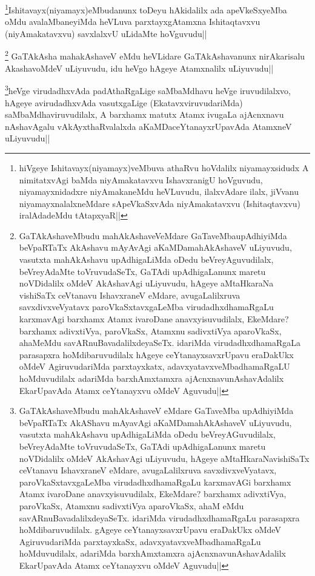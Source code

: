 \begin{artha}
\footnote{hiVgeye Ishitavayx(niyamayx)veMbuva athaRvu hoVdalilx niyamayxsidudx A nimitatxvAgi baMda niyAmakatavxvu IshavxranigU hoVguvudu, niyamayxnidadxre niyAmakaneMdu heVLuvudu, ilalxvAdare ilalx, jiVvanu niyamayxnalalxneMdare sApeVkaSxvAda niyAmakatavxvu (Ishitaqtavxvu) iralAdadeMdu tAtapxyaR||}Ishitavayx(niyamayx)eMbudanunx toDeyu hAkidalilx ada apeVkeSxyeMba oMdu avalaMbaneyiMda heVLuva parxtayxgAtamxna Ishitaqtavxvu (niyAmakatavxvu) savxlalxvU uLidaMte hoVguvudu||
\end{artha}

\begin{artha}
\footnote{GaTAkAshaveMbudu mahAkAshaveVeMdare GaTaveMbaupAdhiyiMda beVpaRTaTx AkAshavu mAyAvAgi aKaMDamahAkAshaveV uLiyuvudu, vasutxta mahAkAshavu upAdhigaLiMda oDedu beVreyAguvudilalx, beVreyAdaMte toVruvudaSeTx, GaTAdi upAdhigaLanunx maretu noVDidalilx oMdeV AkAshavAgi uLiyuvudu, hAgeye aMtaHkaraNa vishiSaTx ceVtanavu IshavxraneV eMdare, avugaLalilxruva savxdivxveVyatavx paroVkaSxtavxgaLeMba virudadhxdhamaRgaLu karxmavAgi barxhamx Atamx ivaroDane anavxyisuvudilalx, EkeMdare? barxhamx adivxtiVya, paroVkaSx, Atamxnu sadivxtiVya aparoVkaSx, ahaMeMdu savARnuBavadalilxdeyaSeTx. idariMda virudadhxdhamaRgaLa parasapxra hoMdibaruvudilalx hAgeye ceYtanayxsavxrUpavu eraDakUkx oMdeV AgiruvudariMda parxtayxkatx, adavxyatavxveMbadhamaRgaLU hoMduvudilalx adariMda barxhAmxtamxra ajAcnxnavunAshavAdalilx EkarUpavAda Atamx ceYtanayxvu oMdeV Aguvudu||} GaTAkAsha mahakAshaveV eMdu heVLidare GaTAkAshavanunx nirAkarisalu AkashavoMdeV uLiyuvudu, idu heVgo hAgeye Atamxnalilx uLiyuvudu||
\end{artha}



\begin{artha}
\footnote{GaTAkAshaveMbudu mahAkAshaveV eMdare GaTaveMba upAdhiyiMda beVpaRTaTx AkAShavu mAyavAgi aKaMDamahAkAshaveV uLiyuvudu, vasutxta mahAkAshavu upAdhigaLiMda oDedu beVreyAGuvudilalx, beVreyAdaMte toVruvudaSeTx, GaTAdi upAdhigaLanunx maretu noVDidalilx oMdeV AkAshavAgi uLiyuvudu, hAgeye aMtaHkaraNavishiSaTx ceVtanavu IshavxraneV eMdare, avugaLalilxruva savxdivxveVyatavx, paroVkaSxtavxgaLeMba virudadhxdhamaRgaLu karxmavAGi barxhamx Atamx ivaroDane anavxyisuvudilalx, EkeMdare? barxhamx adivxtiVya, paroVkaSx, Atamxnu sadivxtiVya aparoVkaSx, ahaM eMdu savARnuBavadalilxdeyaSeTx. idariMda virudadhxdhamaRgaLu parasapxra hoMdibaruvudilalx. gAgeye ceYtanayxsavxrUpavu eraDakUkx oMdeV AgiruvudariMda parxtayxkaSx, adavxyatavxveMbadhamaRgaLu hoMduvudilalx, adariMda barxhAmxtamxra ajAcnxnavunAshavAdalilx EkarUpavAda Atamx ceYtanayxvu oMdeV Aguvudu||}heVge virudadhxvAda padAthaRgaLige saMbaMdhavu heVge iruvudilalxvo, hAgeye avirudadhxvAda vasutxgaLige (EkatavxviruvudariMda) saMbaMdhaviruvudilalx, A barxhamx matutx Atamx ivugaLa ajAcnxnavu nAshavAgalu vAkAyxthaRvalalxda aKaMDaceYtanayxrUpavAda AtamxneV uLiyuvudu||
\end{artha}


